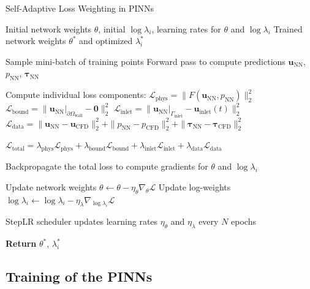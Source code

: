 \documentclass[12pt, a4paper]{article}
\begin{document}
\begin{algorithm}[htbp]
    \caption{Self-Adaptive Loss Weighting in PINNs}
    \label{alg:self_adaptive_weighting}
    \begin{algorithmic}[1]
    \Require Initial network weights $\theta$, initial $\log \lambda_i$, learning rates for $\theta$ and $\log \lambda_i$
    \Ensure Trained network weights $\theta^*$ and optimized $\lambda_i^*$
    
        \State Sample mini-batch of training points
        \State Forward pass to compute predictions $\mathbf{u}_{\mathrm{NN}}$, $p_{\mathrm{NN}}$, $\boldsymbol{\tau}_{\mathrm{NN}}$
        
        \State Compute individual loss components:
            \State \quad $\mathcal{L}_{\mathrm{phys}} = \|F(\mathbf{u}_{\mathrm{NN}}, p_{\mathrm{NN}})\|_2^2$
            \State \quad $\mathcal{L}_{\mathrm{bound}} = \|\mathbf{u}_{\mathrm{NN}}|_{\partial\Omega_{\mathrm{wall}}} - \mathbf{0}\|_2^2$
            \State \quad $\mathcal{L}_{\mathrm{inlet}} = \|\mathbf{u}_{\mathrm{NN}}|_{\Gamma_{\mathrm{inlet}}} - \mathbf{u}_{\mathrm{inlet}}(t)\|_2^2$
            \State \quad $\mathcal{L}_{\mathrm{data}} = \|\mathbf{u}_{\mathrm{NN}} - \mathbf{u}_{\mathrm{CFD}}\|_2^2 + \|p_{\mathrm{NN}} - p_{\mathrm{CFD}}\|_2^2 + \|\boldsymbol{\tau}_{\mathrm{NN}} - \boldsymbol{\tau}_{\mathrm{CFD}}\|_2^2$
        
        \State \quad $\mathcal{L}_{\mathrm{total}} = \lambda_{\mathrm{phys}} \mathcal{L}_{\mathrm{phys}} + \lambda_{\mathrm{bound}} \mathcal{L}_{\mathrm{bound}} + \lambda_{\mathrm{inlet}} \mathcal{L}_{\mathrm{inlet}} + \lambda_{\mathrm{data}} \mathcal{L}_{\mathrm{data}}$
        
        \State Backpropagate the total loss to compute gradients for $\theta$ and $\log \lambda_i$
        
        \State Update network weights $\theta \gets \theta - \eta_{\theta} \nabla_{\theta} \mathcal{L}$
        \State Update log-weights $\log \lambda_i \gets \log \lambda_i - \eta_{\lambda} \nabla_{\log \lambda_i} \mathcal{L}$
        
        \State StepLR scheduler updates learning rates $\eta_{\theta}$ and $\eta_{\lambda}$ every $N$ epochs
    \EndWhile
    
    \State \textbf{Return} $\theta^*$, $\lambda_i^*$
    \end{algorithmic}
\end{algorithm}

\subsection{Training of the PINNs}
\end{document}
